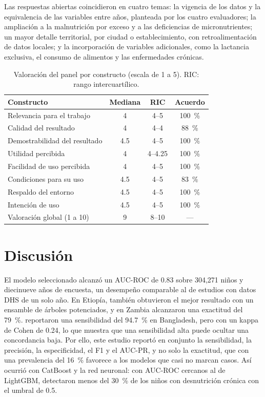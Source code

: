 \documentclass[final,5p,times,twocolumn,authoryear,lefttitle]{elsarticle}
\begin{document}
Las respuestas abiertas coincidieron en cuatro temas: la vigencia de los datos y la equivalencia de las variables entre años, planteada por los cuatro evaluadores; la ampliación a la malnutrición por exceso y a las deficiencias de micronutrientes; un mayor detalle territorial, por ciudad o establecimiento, con retroalimentación de datos locales; y la incorporación de variables adicionales, como la lactancia exclusiva, el consumo de alimentos y las enfermedades crónicas.

\begin{table}[!tp]
\centering
\caption{Valoración del panel por constructo (escala de 1 a 5). RIC: rango intercuartílico.}
\label{tab:panel}
\begin{tabular}{lccc}
\hline
Constructo & Mediana & RIC & Acuerdo \\
\hline
Relevancia para el trabajo & 4 & 4--5 & 100~\% \\
Calidad del resultado & 4 & 4--4 & 88~\% \\
Demostrabilidad del resultado & 4.5 & 4--5 & 100~\% \\
Utilidad percibida & 4 & 4--4.25 & 100~\% \\
Facilidad de uso percibida & 4 & 4--5 & 100~\% \\
Condiciones para su uso & 4.5 & 4--5 & 83~\% \\
Respaldo del entorno & 4.5 & 4--5 & 100~\% \\
Intención de uso & 4.5 & 4--5 & 100~\% \\
\hline
Valoración global (1 a 10) & 9 & 8--10 & --- \\
\hline
\end{tabular}
\end{table}

\FloatBarrier
\section{Discusión}

El modelo seleccionado alcanzó un AUC-ROC de 0.83 sobre 304,271 niños y diecinueve años de encuesta, un desempeño comparable al de estudios con datos DHS de un solo año. En Etiopía, \citet{bitew2021ethiopia} también obtuvieron el mejor resultado con un ensamble de árboles potenciados, y en Zambia \citet{chilyabanyama2022zambia} alcanzaron una exactitud del 79~\%. \citet{talukder2020bangladesh} reportaron una sensibilidad del 94.7~\% en Bangladesh, pero con un kappa de Cohen de 0.24, lo que muestra que una sensibilidad alta puede ocultar una concordancia baja. Por ello, este estudio reportó en conjunto la sensibilidad, la precisión, la especificidad, el F1 y el AUC-PR, y no solo la exactitud, que con una prevalencia del 16~\% favorece a los modelos que casi no marcan casos. Así ocurrió con CatBoost y la red neuronal: con AUC-ROC cercanos al de LightGBM, detectaron menos del 30~\% de los niños con desnutrición crónica con el umbral de 0.5.
\end{document}
